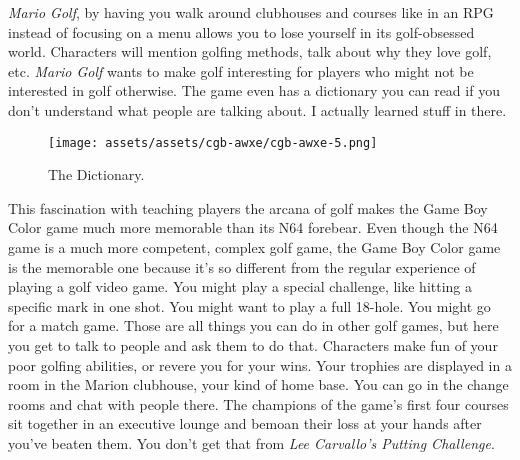 \documentclass{book}
\let\oldcenter\center
\let\oldendcenter\endcenter
\renewenvironment{center}{\setlength\topsep{0pt}\oldcenter}{\oldendcenter}
\begin{document}
\begin{center}
\vspace{8pt}
\quad\vspace{4pt}
\end{center}

\emph{Mario Golf}, by having you walk around clubhouses and courses like in an RPG instead of focusing on a menu allows you to lose yourself in its golf-obsessed world. Characters will mention golfing methods, talk about why they love golf, etc. \emph{Mario Golf} wants to make golf interesting for players who might not be interested in golf otherwise. The game even has a dictionary you can read if you don’t understand what people are talking about. I actually learned stuff in there.

\begin{figure}[hbt]
\vskip 10pt
\centering \texttt{[image: assets/assets/cgb-awxe/cgb-awxe-5.png]}\par\pagetwodescription The Dictionary.
\vskip 6pt
\end{figure}

This fascination with teaching players the arcana of golf makes the Game Boy Color game much more memorable than its N64 forebear. Even though the N64 game is a much more competent, complex golf game, the Game Boy Color game is the memorable one because it’s so different from the regular experience of playing a golf video game. You might play a special challenge, like hitting a specific mark in one shot. You might want to play a full 18-hole. You might go for a match game. Those are all things you can do in other golf games, but here you get to talk to people and ask them to do that. Characters make fun of your poor golfing abilities, or revere you for your wins. Your trophies are displayed in a room in the Marion clubhouse, your kind of home base. You can go in the change rooms and chat with people there. The champions of the game’s first four courses sit together in an executive lounge and bemoan their loss at your hands after you’ve beaten them. You don’t get that from \emph{Lee Carvallo’s Putting Challenge}.
\end{document}
